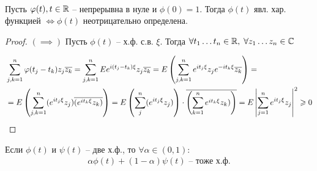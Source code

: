 \begin{theorem}~

  Пусть $\varphi(t), t \in \mathbb{R}$ -- непрерывна в нуле и $\phi(0) = 1$. 
  Тогда $\phi(t)$ явл. хар. функцией $\iff \phi(t)$ неотрицательно определена.

  \begin{proof}
    $(\implies)$ Пусть $\phi(t)$ -- х.ф. с.в. $\xi$.
    Тогда $\forall t_1 \ldots t_n \in \mathbb{R}, \; \forall z_1 \ldots z_n \in \mathbb{C}$

    \begin{align*}
      &\sum_{j, k = 1}^{n} \varphi(t_j - t_k) z_j \overline{z_k} 
      = \sum_{j, k = 1}^{n} E e^{i (t_j - t_k) \xi} z_j \overline{z_k} 
      = E \left( \sum_{j, k = 1}^{n} e^{i t_j \xi} z_j e^{-i t_k \xi} \overline{z_k} \right) = \\
      &= E \left( \sum_{j, k = 1}^{n} (e^{i t_j \xi} z_j) \overline{(e^{i t_k \xi} z_k)} \right)
      = E \left( \sum_{j}^{n} (e^{i t_j \xi} z_j) \right) 
      \cdot \overline{\left( \sum_{k = 1}^{n} e^{i t_k \xi} z_k) \right)}
      = E \left | \sum_{j = 1}^{n} e^{i t_j \xi} z_j  \right |^2 \geqslant 0
    \end{align*}
  \end{proof}
\end{theorem}

\begin{corollary}
  Если $\phi(t)$  и $\psi(t)$ -- две х.ф., 
  то $\forall \alpha \in (0, 1):$ 
  \begin{align*}
    \alpha \phi(t) + (1 - \alpha) \psi(t) \text{ -- тоже х.ф.}
  \end{align*}
\end{corollary}

